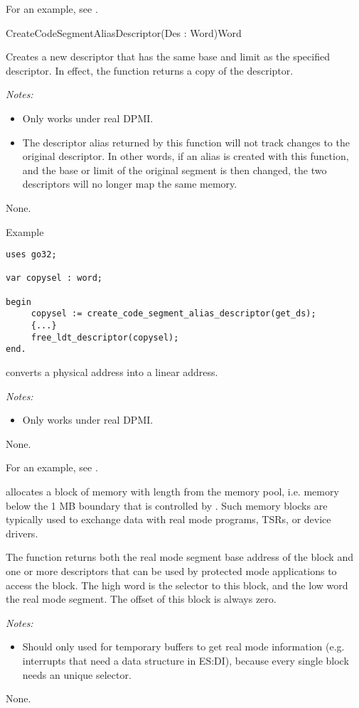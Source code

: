 For an example, see .

{CreateCodeSegmentAliasDescriptor}{(Des : Word)}{Word}
{
Creates a new descriptor that has the same base and limit as the
specified descriptor.  In effect, the function returns a copy of the
descriptor.

{\em Notes:}
\begin{itemize}
\item Only works under real DPMI.
\item The descriptor alias returned by this function will not track changes
to the original descriptor. In other words, if an alias is created with
this function, and the base or limit of the original segment is then
changed, the two descriptors will no longer map the same memory.
\end{itemize}
}
{None.}
{}
\begin{FPCList}
\item[Example]
\begin{verbatim}
uses go32;

var copysel : word;

begin
     copysel := create_code_segment_alias_descriptor(get_ds);
     {...}
     free_ldt_descriptor(copysel);
end.
\end{verbatim}
\end{FPCList}

{ converts a physical address  into 
a linear address.

{\em Notes:}
\begin{itemize}
\item Only works under real DPMI.
\end{itemize}
}{None.}{}

For an example, see .

{
allocates a block of memory with length  from the \dos memory pool, 
i.e. memory below the 1 MB boundary that is controlled by \dos. 
Such memory blocks are typically used to exchange data with real mode 
programs, TSRs, or device drivers. 

The function returns both the real mode segment base address of
the block and one or more descriptors that can be used by protected mode
applications to access the block.
The high word is the selector to this block, and the low word the
\dos real mode segment. The offset of this block is always zero.

{\em Notes:}
\begin{itemize}
\item Should only used for temporary buffers to get real mode information
(e.g. interrupts that need a data structure in ES:DI), because every
single block needs an unique selector.
\end{itemize}
}{None.}{}

